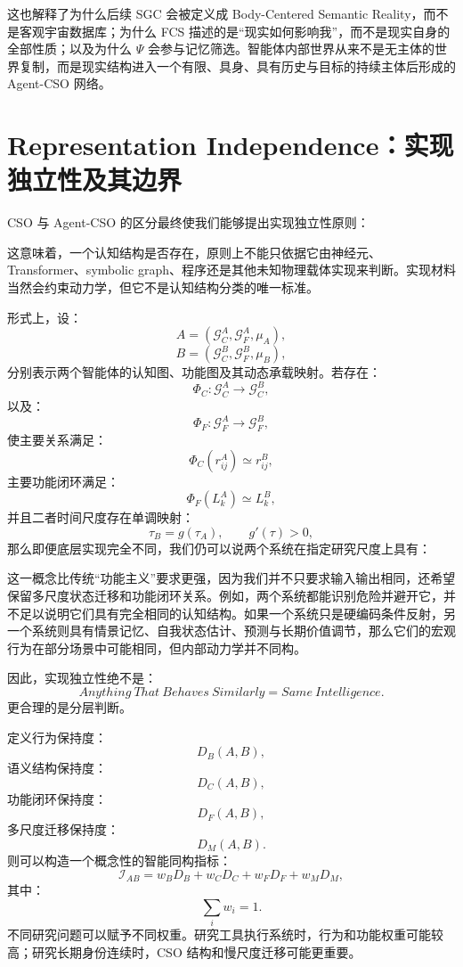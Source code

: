 这也解释了为什么后续 SGC 会被定义成 Body-Centered Semantic Reality，而不是客观宇宙数据库；为什么 FCS 描述的是“现实如何影响我”，而不是现实自身的全部性质；以及为什么 $\Psi$ 会参与记忆筛选。智能体内部世界从来不是无主体的世界复制，而是现实结构进入一个有限、具身、具有历史与目标的持续主体后形成的 Agent-CSO 网络。

\section{Representation Independence：实现独立性及其边界}

CSO 与 Agent-CSO 的区分最终使我们能够提出实现独立性原则：
\begin{statementbox}
\centering
{}
\end{statementbox}
这意味着，一个认知结构是否存在，原则上不能只依据它由神经元、Transformer、symbolic graph、程序还是其他未知物理载体实现来判断。实现材料当然会约束动力学，但它不是认知结构分类的唯一标准。

形式上，设：
\[
A=(\mathcal G_C^A,\mathcal G_F^A,\mu_A),
\]
\[
B=(\mathcal G_C^B,\mathcal G_F^B,\mu_B),
\]
分别表示两个智能体的认知图、功能图及其动态承载映射。若存在：
\[
\Phi_C:
\mathcal G_C^A
\rightarrow
\mathcal G_C^B,
\]
以及：
\[
\Phi_F:
\mathcal G_F^A
\rightarrow
\mathcal G_F^B,
\]
使主要关系满足：
\[
\Phi_C(r_{ij}^A)
\simeq
r_{ij}^B,
\]
主要功能闭环满足：
\[
\Phi_F(L_k^A)
\simeq
L_k^B,
\]
并且二者时间尺度存在单调映射：
\[
\tau_B
=
g(\tau_A),
\qquad
g'(\tau)>0,
\]
那么即便底层实现完全不同，我们仍可以说两个系统在指定研究尺度上具有：
\begin{statementbox}
\centering
{}
\end{statementbox}

这一概念比传统“功能主义”要求更强，因为我们并不只要求输入输出相同，还希望保留多尺度状态迁移和功能闭环关系。例如，两个系统都能识别危险并避开它，并不足以说明它们具有完全相同的认知结构。如果一个系统只是硬编码条件反射，另一个系统则具有情景记忆、自我状态估计、预测与长期价值调节，那么它们的宏观行为在部分场景中可能相同，但内部动力学并不同构。

因此，实现独立性绝不是：
\[
Anything\ That\ Behaves\ Similarly
=
Same\ Intelligence.
\]
更合理的是分层判断。

定义行为保持度：
\[
D_B(A,B),
\]
语义结构保持度：
\[
D_C(A,B),
\]
功能闭环保持度：
\[
D_F(A,B),
\]
多尺度迁移保持度：
\[
D_M(A,B).
\]
则可以构造一个概念性的智能同构指标：
\[
\mathcal I_{AB}
=
w_BD_B
+
w_CD_C
+
w_FD_F
+
w_MD_M,
\]
其中：
\[
\sum_i w_i=1.
\]
不同研究问题可以赋予不同权重。研究工具执行系统时，行为和功能权重可能较高；研究长期身份连续时，CSO 结构和慢尺度迁移可能更重要。

